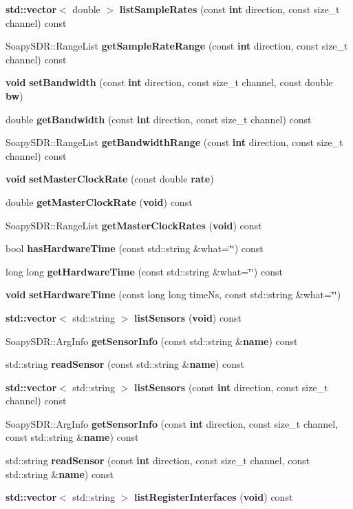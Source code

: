 \begin{DoxyCompactItemize}
\item 
{\bf std\+::vector}$<$ double $>$ {\bf list\+Sample\+Rates} (const {\bf int} direction, const size\+\_\+t channel) const 
\item 
Soapy\+S\+D\+R\+::\+Range\+List {\bf get\+Sample\+Rate\+Range} (const {\bf int} direction, const size\+\_\+t channel) const 
\item 
{\bf void} {\bf set\+Bandwidth} (const {\bf int} direction, const size\+\_\+t channel, const double {\bf bw})
\item 
double {\bf get\+Bandwidth} (const {\bf int} direction, const size\+\_\+t channel) const 
\item 
Soapy\+S\+D\+R\+::\+Range\+List {\bf get\+Bandwidth\+Range} (const {\bf int} direction, const size\+\_\+t channel) const 
\item 
{\bf void} {\bf set\+Master\+Clock\+Rate} (const double {\bf rate})
\item 
double {\bf get\+Master\+Clock\+Rate} ({\bf void}) const 
\item 
Soapy\+S\+D\+R\+::\+Range\+List {\bf get\+Master\+Clock\+Rates} ({\bf void}) const 
\item 
bool {\bf has\+Hardware\+Time} (const std\+::string \&what=\char`\"{}\char`\"{}) const 
\item 
long long {\bf get\+Hardware\+Time} (const std\+::string \&what=\char`\"{}\char`\"{}) const 
\item 
{\bf void} {\bf set\+Hardware\+Time} (const long long time\+Ns, const std\+::string \&what=\char`\"{}\char`\"{})
\item 
{\bf std\+::vector}$<$ std\+::string $>$ {\bf list\+Sensors} ({\bf void}) const 
\item 
Soapy\+S\+D\+R\+::\+Arg\+Info {\bf get\+Sensor\+Info} (const std\+::string \&{\bf name}) const 
\item 
std\+::string {\bf read\+Sensor} (const std\+::string \&{\bf name}) const 
\item 
{\bf std\+::vector}$<$ std\+::string $>$ {\bf list\+Sensors} (const {\bf int} direction, const size\+\_\+t channel) const 
\item 
Soapy\+S\+D\+R\+::\+Arg\+Info {\bf get\+Sensor\+Info} (const {\bf int} direction, const size\+\_\+t channel, const std\+::string \&{\bf name}) const 
\item 
std\+::string {\bf read\+Sensor} (const {\bf int} direction, const size\+\_\+t channel, const std\+::string \&{\bf name}) const 
\item 
{\bf std\+::vector}$<$ std\+::string $>$ {\bf list\+Register\+Interfaces} ({\bf void}) const 

\end{DoxyCompactItemize}
